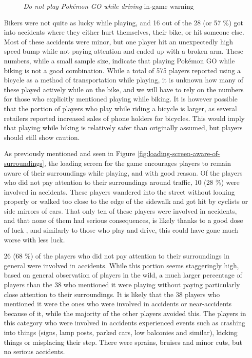 \begin{figure}[h]
	\centering
	\caption{\emph{Do not play Pokémon GO while driving} in-game warning}
	\label{fig:do-not-play-and-drive}
\end{figure}

Bikers were not quite as lucky while playing, and 16 out of the 28 (or 57 \%) got into accidents where they either hurt themselves, their bike, or hit someone else. Most of these accidents were minor, but one player hit an unexpectedly high speed bump while not paying attention and ended up with a broken arm. These numbers, while a small sample size, indicate that playing Pokémon GO while biking is not a good combination. While a total of 575 players reported using a bicycle as a method of transportation while playing, it is unknown how many of these played actively while on the bike, and we will have to rely on the numbers for those who explicitly mentioned playing while biking. It is however possible that the portion of players who play while riding a bicycle is larger, as several retailers reported increased sales of phone holders for bicycles. This would imply that playing while biking is relatively safer than originally assumed, but players should still show caution.

As previously mentioned and seen in Figure \ref{fig:loading-screen-aware-of-surroundings}, the loading screen for the game encourages players to remain aware of their surroundings while playing, and with good reason. Of the players who did not pay attention to their surroundings around traffic, 10 (28 \%) were involved in accidents. These players wandered into the street without looking properly or walked too close to the edge of the sidewalk and got hit by cyclists or side mirrors of cars. That only ten of these players were involved in accidents, and that none of them had serious consequences, is likely thanks to a good dose of luck , and similarly to those who play and drive, this could have gone much worse with less luck.

26 (68 \%) of the players who did not pay attention to their surroundings in general were involved in accidents. While this portion seems staggeringly high, based on general observation of players in the wild, a much larger percentage of players than the 38 who mentioned it were playing without paying particularly close attention to their surroundings. It is likely that the 38 players who mentioned it were the ones who were involved in accidents or near-accidents because of it, while the majority of the other players avoided this. The players in this category who were involved in accidents experienced events such as crashing into things (signs, lamp posts, parked cars, low balconies and similar), kicking things or misplacing their step. There were sprains, bruises and minor cuts, but no serious accidents.

